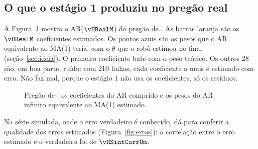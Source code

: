 \documentclass[11pt,a4paper]{article}
\newcommand{\arq}[1]{../../../dados/resultados/hannan_rissanen_2026-10-30/#1}
\begin{document}
\subsection{O que o estágio 1 produziu no pregão real}

A Figura~\ref{fig:estagio1} mostra o AR($\vHRealM$) do pregão de \vHDiaReal. As barras laranja são os $\vHRealM$
coeficientes estimados. Os pontos azuis são os pesos que o AR equivalente ao MA(1) teria, com o $\theta$ que o robô
estimou no final (seção~\ref{sec:ideia}). O primeiro coeficiente bate com o peso teórico. Os outros 28 são, em boa
parte, ruído: com 210 linhas, cada coeficiente a mais é estimado com erro. Não faz mal, porque o estágio 1 não usa os
coeficientes, só os resíduos.

\begin{figure}[htbp]\centering
{}
\caption{Pregão de \vHDiaReal: os coeficientes do AR comprido e os pesos do AR infinito equivalente ao MA(1) estimado.}
\label{fig:estagio1}
\end{figure}

Na série simulada, onde o erro verdadeiro é conhecido, dá para conferir a qualidade dos erros estimados
(Figura~\ref{fig:erros}): a correlação entre o erro estimado e o verdadeiro foi de $\vHSintCorrUm$.
\end{document}
